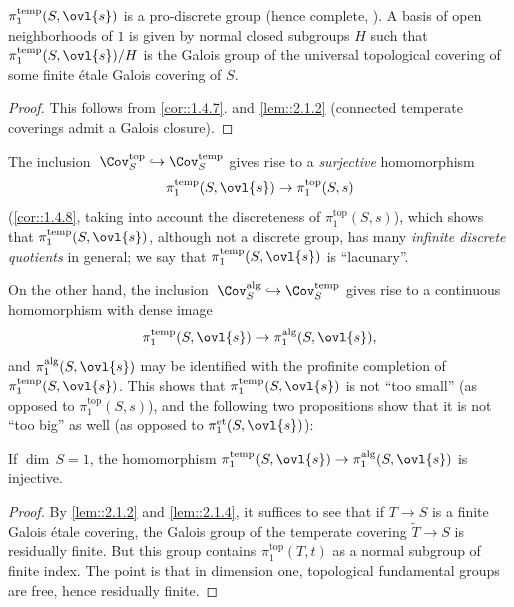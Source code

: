 \begin{lem}\label{lem::2.1.4} $\pi_1^{\mathrm{temp}}(S,\ovl{s})$ is a
 pro-discrete group (hence complete, 
\cf \cite[III. 57.7]{bourbaki74:_topol}).  A basis of open neighborhoods of
$1$ is given by normal closed subgroups $H$ such that
 $\pi_1^{\mathrm{temp}}(S,\ovl{s})/H$ is the Galois group of the
 universal topological covering of some finite \'etale Galois covering of $S$.
\end{lem}
\begin{proof}
 This follows from \ref{cor::1.4.7}. and \ref{lem::2.1.2} (connected
 temperate coverings admit a Galois closure).
\end{proof}

 \medskip 
 The inclusion $\; \Cov^{\mathrm{top}}_S \hookrightarrow
 \Cov^{\mathrm{temp}}_S$ gives rise to a {\it surjective} homomorphism 
 \begin{equation*}
  \pi_1^{\mathrm{temp}}(S,\ovl{s}) \to \pi_1^{\mathrm{top}}(S,s) 
 \end{equation*} 
 (\cf \ref{cor::1.4.8}, taking
 into account the discreteness of $\pi_1^{\mathrm{top}}(S,s) $), which
 shows that $\pi_1^{\mathrm{temp}}(S,\ovl{s})$, although not a discrete 
 group, has many {\it infinite discrete quotients} in general; we say
 that $\pi_1^{\mathrm{temp}}(S,\ovl{s})$ is ``lacunary''.

 \medskip On the other hand, the inclusion $\; \Cov^{\mathrm{alg}}_S
 \hookrightarrow  \Cov^{\mathrm{temp}}_S$ gives rise to a 
 continuous homomorphism with dense image
 \begin{equation*}
  \pi_1^{\mathrm{temp}}(S,\ovl{s})\to \pi_1^{\mathrm{alg}}(S,\ovl{s}),
 \end{equation*}
 and $ \pi_1^{\mathrm{alg}}(S,\ovl{s}) $ may be identified with the
 profinite completion of $\pi_1^{\mathrm{temp}}(S,\ovl{s})$. This shows
 that $\pi_1^{\mathrm{temp}}(S,\ovl{s})$ is not ``too small'' (as opposed
 to $\pi_1^{\mathrm{top}}(S,s) $), and the following two propositions
 show that it is not ``too big'' as well (as opposed to
 $\pi_1^{\mathrm{et}}(S,\ovl{s}) $): 
 
\begin{pro}\label{pro::2.1.5} If $\dim\,S=1$, the homomorphism
 $\pi_1^{\mathrm{temp}}(S,\ovl{s})\to \pi_1^{\mathrm{alg}}(S,\ovl{s}) $
 is injective. 
\end{pro}

\begin{proof}
 By \ref{lem::2.1.2} and \ref{lem::2.1.4}, it suffices to see that if
 $T\to S$ is a finite 
 Galois \'etale covering, the Galois group of the temperate covering
 $\tilde T\to S$ is residually finite. But this group contains
 $\pi_1^{\mathrm{top}}(T,t)$ as a normal subgroup of finite index. The
 point is that in dimension one, topological fundamental groups are free,
 hence residually finite.
\end{proof}

